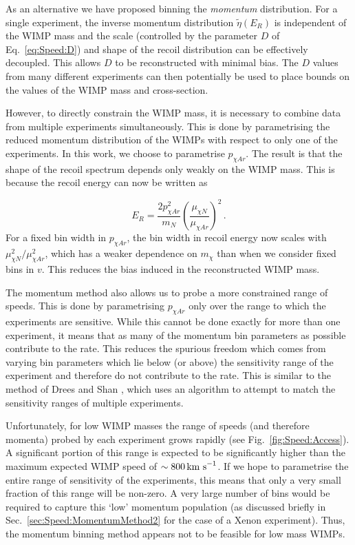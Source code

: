 As an alternative we have proposed binning the \textit{momentum} distribution. For a single experiment, the inverse momentum distribution $\tilde{\eta}(E_R)$ is independent of the WIMP mass and the scale (controlled by the parameter $D$ of Eq.~\ref{eq:Speed:D}) and shape of the recoil distribution can be effectively decoupled. This allows $D$ to be reconstructed with minimal bias. The $D$ values from many different experiments can then potentially be used to place bounds on the values of the WIMP mass and cross-section. 

However, to directly constrain the WIMP mass, it is necessary to combine data from multiple experiments simultaneously. This is done by parametrising the reduced momentum distribution of the WIMPs with respect to only one of the experiments. In this work, we choose to parametrise $p_{\chi Ar}$. The result is that the shape of the recoil spectrum depends only weakly on the WIMP mass. This is because the recoil energy can now be written as 

\begin{equation}
E_R = \frac{2 p_{\chi Ar}^2}{m_N} \left(\frac{\mu_{\chi N}}{\mu_{\chi Ar}}\right)^2\,.
\end{equation}
For a fixed bin width in $p_{\chi Ar}$, the bin width in recoil energy now scales with$\mu_{\chi N}^2/ \mu_{\chi Ar}^2$, which has a weaker dependence on $m_\chi$ than when we consider fixed bins in $v$. This reduces the bias induced in the reconstructed WIMP mass. 

The momentum method also allows us to probe a more constrained range of speeds. This is done by parametrising $p_{\chi Ar}$ only over the range to which the experiments are sensitive. While this cannot be done exactly for more than one experiment, it means that as many of the momentum bin parameters as possible contribute to the rate. This reduces the spurious freedom which comes from varying bin parameters which lie below (or above) the sensitivity range of the experiment and therefore do not contribute to the rate.  This is similar to the method of Drees and Shan \cite{Drees:2008}, which uses an algorithm to attempt to match the sensitivity ranges of multiple experiments.

Unfortunately, for low WIMP masses the range of speeds (and therefore momenta) probed by each experiment grows rapidly (see Fig.~\ref{fig:Speed:Access}). A significant portion of this range is expected to be significantly higher than the maximum expected WIMP speed of $\sim 800 \,\textrm{km s}^{-1}$. If we hope to parametrise the entire range of sensitivity of the experiments, this means that only a very small fraction of this range will be non-zero. A very large number of bins would be required to capture this `low' momentum population (as discussed briefly in Sec.~\ref{sec:Speed:MomentumMethod2} for the case of a Xenon experiment). Thus, the momentum binning method appears not to be feasible for low mass WIMPs.

